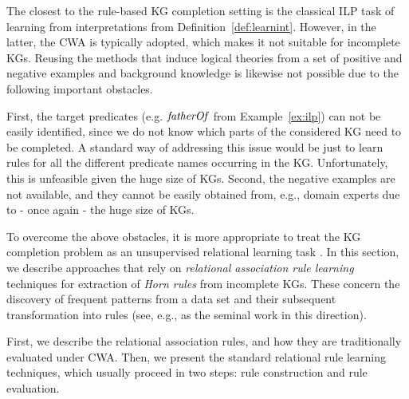 The closest to the rule-based KG completion setting is the classical ILP task of learning from interpretations from Definition~\ref{def:learnint}. However, in the latter, the CWA is typically adopted, which makes it not suitable for incomplete KGs. Reusing the methods that induce logical theories from a set of positive and negative examples and background knowledge is likewise not possible due to the following important obstacles. %

First, the target predicates (e.g. $\mathit{fatherOf}$ from Example~\ref{ex:ilp}) can
not be easily identified, since we do not know which parts of the considered KG need to
 be completed. A standard way of addressing this issue would be just to learn rules for all
 the different predicate names occurring in the KG. Unfortunately, this is unfeasible
 given the huge size of KGs. Second, the negative examples are not available,
 and they cannot be easily obtained from, e.g., domain experts due to - once again
 - the huge size of KGs. %

To overcome the above obstacles, it %
is more appropriate to treat the KG completion problem as an unsupervised relational learning task \cite{amie}.
In this section, we describe approaches that rely on \emph{relational association rule learning} techniques for extraction of \emph{Horn rules} from incomplete KGs. 
These concern the discovery of frequent patterns from a data set and their subsequent transformation into rules
(see, e.g., \cite{DBLP:conf/ilp/DehaspeR97} as the seminal work in this direction). %

First, we describe the relational association rules, and how they are traditionally evaluated under CWA. Then, we present the standard relational rule learning techniques, which usually proceed in two 
steps: rule construction and rule evaluation. %


